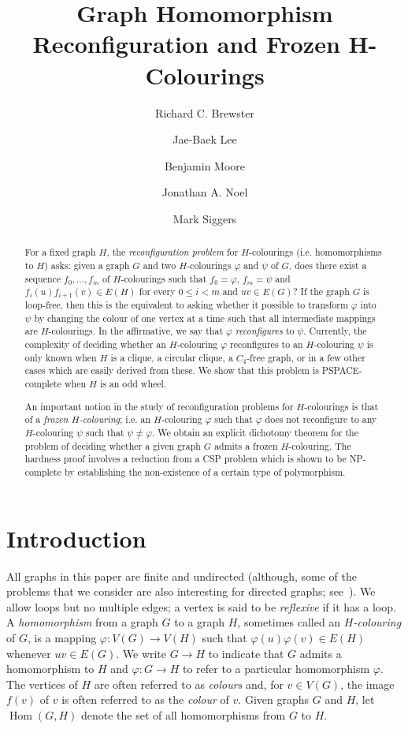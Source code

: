 \documentclass[11 pt]{amsart}
\title{Graph Homomorphism Reconfiguration and Frozen $\boldsymbol{H}$-Colourings}
\author[Brewster]{Richard C. Brewster}
\author[Lee]{Jae-Baek Lee}
\author[Moore]{Benjamin Moore}
\author[Noel]{Jonathan A. Noel}
\author[Siggers]{Mark Siggers}
\date{}
\theoremstyle{definition}
\theoremstyle{case}
\numberwithin{equation}{section}
\newcommand{\Hom}{\operatorname{Hom}}
\begin{document}
\begin{abstract}
For a fixed graph $H$, the \emph{reconfiguration problem} for $H$-colourings (i.e. homomorphisms to $H$) asks: given a graph $G$ and two $H$-colourings $\varphi$ and $\psi$ of $G$, does there exist a sequence $f_0,\dots,f_m$ of $H$-colourings such that $f_0=\varphi$, $f_m=\psi$ and $f_i(u)f_{i+1}(v)\in E(H)$ for every $0\leq i<m$ and $uv\in E(G)$? If the graph $G$ is loop-free, then this is the equivalent to asking whether it possible to transform $\varphi$ into $\psi$ by changing the colour of one vertex at a time such that all intermediate mappings are $H$-colourings. In the affirmative, we say that $\varphi$ \emph{reconfigures} to $\psi$. Currently, the complexity of deciding whether an $H$-colouring $\varphi$ reconfigures to an $H$-colouring $\psi$ is only known when $H$ is a clique, a circular clique, a $C_4$-free graph, or in a few other cases which are easily derived from these. We show that this problem is PSPACE-complete when $H$ is an odd wheel. 

An important notion in the study of reconfiguration problems for $H$-colourings is that of a \emph{frozen $H$-colouring}; i.e. an $H$-colouring $\varphi$ such that $\varphi$ does not reconfigure to any $H$-colouring $\psi$ such that $\psi\neq \varphi$. We obtain an explicit dichotomy theorem for the problem of deciding whether a given graph $G$ admits a frozen $H$-colouring. The hardness proof involves a reduction from a CSP problem which is shown to be NP-complete by establishing the non-existence of a certain type of polymorphism. 
\end{abstract}

\maketitle

\section{Introduction}

All graphs in this paper are finite and undirected (although, some of the problems that we consider are also interesting for directed graphs; see~\cite{directed}). We allow loops but no multiple edges; a vertex is said to be \emph{reflexive} if it has a loop.  A \emph{homomorphism} from a graph $G$ to a graph $H$, sometimes called an \emph{$H$-colouring} of $G$, is a mapping $\varphi:V(G)\to V(H)$ such that $\varphi(u)\varphi(v)\in E(H)$ whenever $uv\in E(G)$. We write $G\to H$ to indicate that $G$ admits a homomorphism to $H$ and $\varphi:G\to H$ to refer to a particular homomorphism $\varphi$. The vertices of $H$ are often referred to as \emph{colours} and, for $v\in V(G)$, the image $f(v)$ of $v$ is often referred to as the \emph{colour} of $v$. Given graphs $G$ and $H$, let  $\Hom(G,H)$ denote the set of all homomorphisms from $G$ to $H$. 
\end{document}
